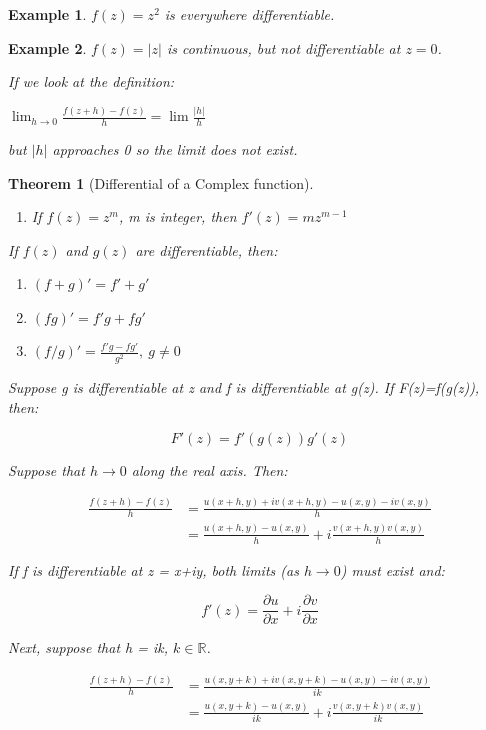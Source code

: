 \documentclass{article}
\newtheorem{theorem}{Theorem}[section]
\newtheorem{ex}{Example}
\theoremstyle{definition}
\def\R{\mathbb{R}}
\begin{document}
\begin{ex}
$f(z) = z^2$ is everywhere differentiable. 
\end{ex}

\begin{ex}
	$f(z) = |z|$ is continuous, but not differentiable at $z = 0$. 
	
	If we look at the definition:
	
	$\lim_{h\to0} \frac{f(z+h) - f(z)}{h} = \lim \frac{|h|}{h}$
	
	but $|h|$ approaches 0 so the limit does not exist.
\end{ex}



\begin{theorem}[Differential of a Complex function]
\begin{enumerate}
	\item If $f(z) = z^m$, m is integer, then $f'(z) = mz^{m-1}$
\end{enumerate}
If $f(z)$ and $g(z)$ are differentiable, then:
\begin{enumerate}
	\item$(f+g)' = f'+g'$
	\item$(fg)' = f'g + fg'$
	\item$(f/g)' = \frac{f'g-fg'}{g^2},\ g \neq 0 $
\end{enumerate}


Suppose g is differentiable at z and f is differentiable at g(z). If F(z)=f(g(z)), then:

$$ F'(z) = f'(g(z))g'(z)$$

Suppose that $h \to 0$ along the real axis. Then:

\begin{align}
\frac{f(z+h) - f(z)}{h} & = \frac{u(x+h, y) + iv(x+h,y) - u(x,y) - iv(x,y)}{h}\\
& = \frac{u(x+h, y) - u(x,y) }{h} + i \frac{v(x+h,y) v(x,y)}{h}
\end{align}

If f is differentiable at z = x+iy, both limits (as $h \to 0$) must exist and:

$$f'(z) = \frac{\partial u}{\partial x} + i  \frac{\partial v}{\partial x}$$

Next, suppose that h = ik, $k \in \R$.

\begin{align}
\frac{f(z+h) - f(z)}{h} & = \frac{u(x, y+k) + iv(x,y+k) - u(x,y) - iv(x,y)}{ik}\\
& = \frac{u(x, y+k) - u(x,y) }{ik} + i \frac{v(x,y+k) v(x,y)}{ik}
\end{align}


\end{theorem}
\end{document}
